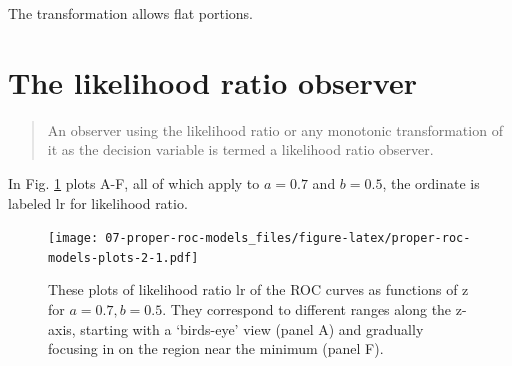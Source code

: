 \documentclass[
]{book}
\begin{document}
The transformation allows flat portions.

\hypertarget{proper-roc-models-likelihood-ratio-observer}{%
\section{The likelihood ratio observer}\label{proper-roc-models-likelihood-ratio-observer}}

\begin{quote}
An observer using the likelihood ratio or any monotonic transformation of it as the decision variable is termed a likelihood ratio observer.
\end{quote}

In Fig. \ref{fig:proper-roc-models-plots-2} plots A-F, all of which apply to \(a = 0.7\) and \(b = 0.5\), the ordinate is labeled \(\text{lr}\) for likelihood ratio.

\begin{figure}
\centering
\texttt{[image: 07-proper-roc-models\_files/figure-latex/proper-roc-models-plots-2-1.pdf]}
\caption{\label{fig:proper-roc-models-plots-2}These plots of likelihood ratio \(\text{lr}\) of the ROC curves as functions of z for \(a = 0.7, b = 0.5\). They correspond to different ranges along the z-axis, starting with a `birds-eye' view (panel A) and gradually focusing in on the region near the minimum (panel F).}
\end{figure}
\end{document}
